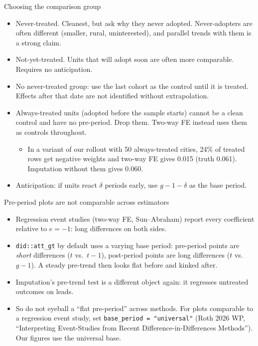 \documentclass[aspectratio=169,11pt]{beamer}
\begin{document}
\begin{frame}{Choosing the comparison group}
\begin{itemize}
	\item \alert{Never-treated.} Cleanest, but ask why they never adopted. Never-adopters are often different (smaller,
	rural, uninterested), and parallel trends with them is a strong claim.
	\medskip
	\item \alert{Not-yet-treated.} Units that will adopt soon are often more comparable. Requires no anticipation.
	\medskip
	\item \alert{No never-treated group}: use the last cohort as the control until it is treated. Effects after that date are not
	identified without extrapolation.
	\medskip
	\item \alert{Always-treated units} (adopted before the sample starts) cannot be a clean control and have no pre-period. Drop
	them. Two-way FE instead uses them as controls throughout.
	\begin{itemize}
		\item In a variant of our rollout with 50 always-treated cities, 24\% of treated rows get negative weights and two-way FE
		gives 0.015 (truth 0.061). Imputation without them gives 0.060.
	\end{itemize}
	\medskip
	\item \alert{Anticipation}: if units react $\delta$ periods early, use $g - 1 - \delta$ as the base period.
\end{itemize}
\end{frame}


\begin{frame}{Pre-period plots are not comparable across estimators}
\begin{itemize}
	\item Regression event studies (two-way FE, Sun--Abraham) report every coefficient relative to $e = -1$: long differences
	on both sides.
	\medskip
	\item \texttt{did::att\_gt} by default uses a \alert{varying} base period: pre-period points are \emph{short} differences
	($t$ vs.\ $t-1$), post-period points are long differences ($t$ vs.\ $g-1$). A steady pre-trend then looks flat before and
	kinked after.
	\medskip
	\item Imputation's pre-trend test is a different object again: it regresses untreated outcomes on leads.
	\medskip
	\item So do not eyeball a ``flat pre-period'' across methods. For plots comparable to a regression event study, set
	\texttt{base\_period = "universal"} (Roth 2026 WP, ``Interpreting Event-Studies from Recent Difference-in-Differences Methods'').
	Our figures use the universal base.
\end{itemize}
\end{frame}
\end{document}
